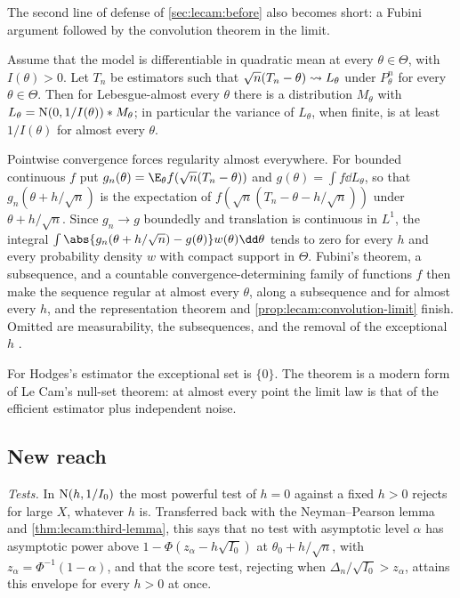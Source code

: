 \begin{refsection}
The second line of defense of \cref{sec:lecam:before} also becomes short: a Fubini argument followed by the convolution theorem in the limit.

\begin{theorem}\label{thm:lecam:superefficiency}
Assume that the model is differentiable in quadratic mean at every $\theta\in\Theta$, with $I(\theta)>0$. Let $T_n$ be estimators such that $\sqrt n(T_n-\theta)\rightsquigarrow L_\theta$ under $P^n_\theta$ for every $\theta\in\Theta$. Then for Lebesgue-almost every $\theta$ there is a distribution $M_\theta$ with $L_\theta=\mathrm{N}(0,1/I(\theta))*M_\theta$; in particular the variance of $L_\theta$, when finite, is at least $1/I(\theta)$ for almost every $\theta$.
\end{theorem}

\begin{proofsketch}
Pointwise convergence forces regularity almost everywhere. For bounded continuous $f$ put $g_n(\theta)=\E_\theta f(\sqrt n(T_n-\theta))$ and $g(\theta)=\int f\dd L_\theta$, so that $g_n(\theta+h/\sqrt n)$ is the expectation of $f(\sqrt n(T_n-\theta-h/\sqrt n))$ under $\theta+h/\sqrt n$. Since $g_n\to g$ boundedly and translation is continuous in $L^1$, the integral $\int\abs{g_n(\theta+h/\sqrt n)-g(\theta)}w(\theta)\dd\theta$ tends to zero for every $h$ and every probability density $w$ with compact support in $\Theta$. Fubini's theorem, a subsequence, and a countable convergence-determining family of functions $f$ then make the sequence regular at almost every $\theta$, along a subsequence and for almost every $h$, and the representation theorem and \cref{prop:lecam:convolution-limit} finish. Omitted are measurability, the subsequences, and the removal of the exceptional $h$ \parencite[Chapter~8]{vanderVaart1998}.
\end{proofsketch}

For Hodges's estimator the exceptional set is $\{0\}$. The theorem is a modern form of Le Cam's null-set theorem: at almost every point the limit law is that of the efficient estimator plus independent noise.

\subsection{New reach}

\emph{Tests.} In $\mathrm{N}(h,1/I_0)$ the most powerful test of $h=0$ against a fixed $h>0$ rejects for large $X$, whatever $h$ is. Transferred back with the Neyman--Pearson lemma and \cref{thm:lecam:third-lemma}, this says that no test with asymptotic level $\alpha$ has asymptotic power above $1-\Phi(z_\alpha-h\sqrt{I_0})$ at $\theta_0+h/\sqrt n$, with $z_\alpha=\Phi^{-1}(1-\alpha)$, and that the score test, rejecting when $\Delta_n/\sqrt{I_0}>z_\alpha$, attains this envelope for every $h>0$ at once.


\end{refsection}
